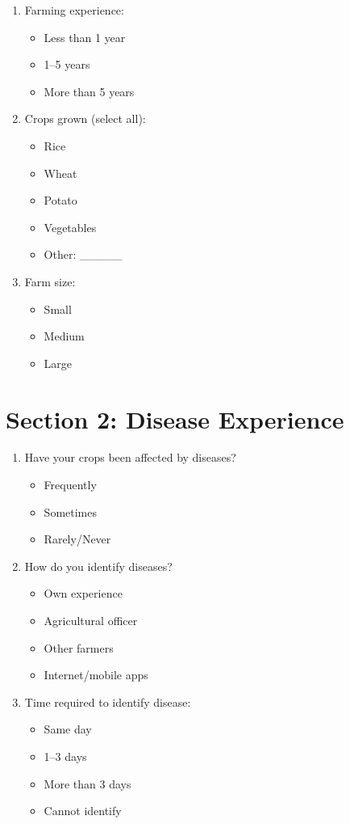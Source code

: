 \documentclass[12pt,a4paper]{article}
\begin{document}
\begin{enumerate}
\item Farming experience:
\begin{itemize}
\item Less than 1 year
\item 1--5 years
\item More than 5 years
\end{itemize}

\item Crops grown (select all):
\begin{itemize}
\item Rice
\item Wheat
\item Potato
\item Vegetables
\item Other: \_\_\_\_\_
\end{itemize}

\item Farm size:
\begin{itemize}
\item Small
\item Medium
\item Large
\end{itemize}

\end{enumerate}

\section*{Section 2: Disease Experience}

\begin{enumerate}[start=4]

\item Have your crops been affected by diseases?
\begin{itemize}
\item Frequently
\item Sometimes
\item Rarely/Never
\end{itemize}

\item How do you identify diseases?
\begin{itemize}
\item Own experience
\item Agricultural officer
\item Other farmers
\item Internet/mobile apps
\end{itemize}

\item Time required to identify disease:
\begin{itemize}
\item Same day
\item 1--3 days
\item More than 3 days
\item Cannot identify
\end{itemize}

\end{enumerate}
\end{document}
